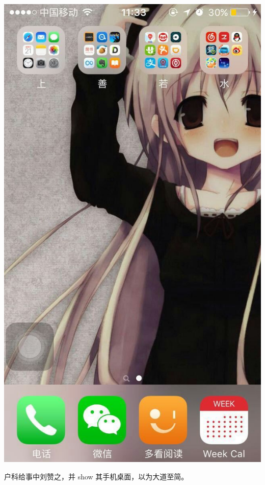 \documentclass[12pt, a4paper]{book}
\begin{document}
\begin{CJK}{UTF8}{gbsn}
    \includegraphics[height=0.3\textheight]{./figure/desktop-2.jpg}

    户科给事中刘赞之，并 show 其手机桌面，以为大道至简。


\end{CJK}
\end{document}
